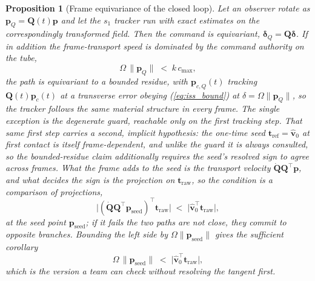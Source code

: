 \documentclass[lettersize,journal]{IEEEtran}
\newtheorem{proposition}{Proposition}
\begin{document}
\begin{proposition}[Frame equivariance of the closed loop]
\label{prop:equivariance}
Let an observer rotate as $\mathbf{p}_Q = \mathbf{Q}(t)\mathbf{p}$ and
let the $s_1$ tracker run with exact estimates on the correspondingly
transformed field. Then the command is equivariant,
$\boldsymbol{\delta}_Q = \mathbf{Q}\boldsymbol{\delta}$. If in addition
the frame-transport speed is dominated by the command authority on the
tube,
\begin{equation}
    \Omega\,\lVert\mathbf{p}_Q\rVert \;<\; k\,c_{\max} ,
    \label{eq:transport_cond}
\end{equation}
the path is equivariant to a bounded residue, with
$\mathbf{p}_{c,Q}(t)$ tracking $\mathbf{Q}(t)\mathbf{p}_c(t)$ at a
transverse error obeying
(\ref{eq:iss_bound}) at $\delta = \Omega\lVert\mathbf{p}_Q\rVert$, so the
tracker follows the same material structure in every frame. The single
exception is the degenerate guard, reachable only on the first tracking
step. That same first step carries a second, implicit hypothesis: the
one-time seed $\mathbf{t}_{\text{ref}} = \hat{\mathbf{v}}_0$ at first
contact is itself frame-dependent, and unlike the guard it is always
consulted, so the bounded-residue claim additionally requires the seed's
resolved sign to agree across frames. What the frame adds to the seed is
the transport velocity $\dot{\mathbf{Q}}\mathbf{Q}^\top\mathbf{p}$, and
what decides the sign is the projection on
$\mathbf{t}_{\text{raw}}$, so the condition is a comparison of
projections,
\begin{equation}
    \lvert(\dot{\mathbf{Q}}\mathbf{Q}^\top\mathbf{p}_{\text{seed}})^\top
    \mathbf{t}_{\text{raw}}\rvert
    \;<\; \lvert\hat{\mathbf{v}}_0^\top\mathbf{t}_{\text{raw}}\rvert,
    \label{eq:seed_cond}
\end{equation}
at the seed point $\mathbf{p}_{\text{seed}}$; if it fails the two paths
are not close, they commit to opposite branches. Bounding the left side
by $\Omega\lVert\mathbf{p}_{\text{seed}}\rVert$ gives the sufficient
corollary
\begin{equation}
    \Omega\,\lVert\mathbf{p}_{\text{seed}}\rVert
    \;<\; \lvert\hat{\mathbf{v}}_0^\top\mathbf{t}_{\text{raw}}\rvert,
    \label{eq:seed_cond_suff}
\end{equation}
which is the version a team can check without resolving the tangent
first.
\end{proposition}
\end{document}
